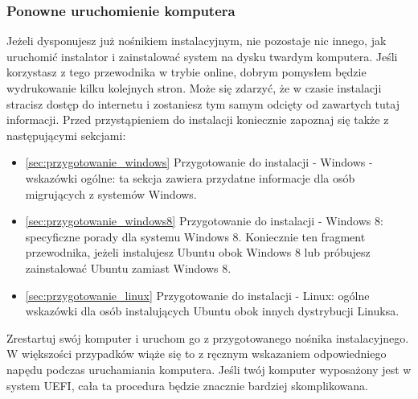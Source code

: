 \subsubsection{Ponowne uruchomienie komputera}
Jeżeli dysponujesz już  nośnikiem instalacyjnym, nie pozostaje nic innego, jak uruchomić instalator i zainstalować system na dysku twardym komputera. Jeśli korzystasz z tego przewodnika w trybie online, dobrym pomysłem będzie wydrukowanie kilku kolejnych stron. Może się zdarzyć, że w czasie instalacji stracisz dostęp do internetu i zostaniesz tym samym odcięty od zawartych tutaj informacji.
Przed przystąpieniem do instalacji koniecznie zapoznaj się także z następującymi sekcjami:
\begin{itemize}
\item \ref{sec:przygotowanie_windows} \textcolor{ubuntu_orange}{Przygotowanie do instalacji - Windows - wskazówki ogólne}: ta sekcja zawiera przydatne informacje dla osób migrujących z systemów Windows.
\item \ref{sec:przygotowanie_windows8} \textcolor{ubuntu_orange}{Przygotowanie do instalacji - Windows 8}: specyficzne porady dla systemu Windows 8. Koniecznie ten fragment przewodnika, jeżeli instalujesz Ubuntu obok Windows 8 lub próbujesz zainstalować Ubuntu zamiast Windows 8.
\item \ref{sec:przygotowanie_linux} \textcolor{ubuntu_orange}{Przygotowanie do instalacji - Linux}: ogólne wskazówki dla osób instalujących Ubuntu obok innych dystrybucji Linuksa.
\end{itemize}

Zrestartuj swój komputer i uruchom go z przygotowanego nośnika instalacyjnego. W większości przypadków wiąże się to z ręcznym wskazaniem odpowiedniego napędu podczas uruchamiania komputera. Jeśli twój komputer wyposażony jest w system UEFI, cała ta procedura będzie znacznie bardziej skomplikowana.
